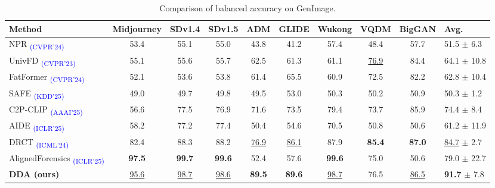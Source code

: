 \documentclass{article}
\begin{document}
\begin{table}[tb!]
  \centering
\caption{Comparison of balanced accuracy on GenImage.}
\label{tab:compare-genimage}
 \begin{adjustbox}{width=\linewidth}
      \begin{tabular}{lccccccccl}
      \toprule
      Method & Midjourney & SDv1.4 & SDv1.5 & ADM & GLIDE & Wukong & VQDM & BigGAN & Avg. \\
      \midrule
NPR \textsubscript{\textcolor{blue}{(CVPR'24)}} \cite{cozzolino2024zero} & 53.4 & 55.1 & 55.0 & 43.8 & 41.2 & 57.4 & 48.4 & 57.7 & 51.5 $\pm$ 6.3 \\
UnivFD \textsubscript{\textcolor{blue}{(CVPR'23)}} \cite{ojha2023towards} & 55.1 & 55.6 & 55.7 & 62.5 & 61.3 & 61.1 & \underline{76.9} & 84.4 & 64.1 $\pm$ 10.8 \\  
FatFormer \textsubscript{\textcolor{blue}{(CVPR'24)}} \cite{liu2024forgery} & 52.1 & 53.6 & 53.8 & 61.4 & 65.5 & 60.9 & 72.5 & 82.2 & 62.8 $\pm$ 10.4 \\
SAFE \textsubscript{\textcolor{blue}{(KDD'25)}} \cite{li2024improving} & 49.0 & 49.7 & 49.8 & 49.5 & 53.0 & 50.3 & 50.2 & 50.9 & 50.3 $\pm$ 1.2 \\
C2P-CLIP \textsubscript{\textcolor{blue}{(AAAI'25)}} \cite{tan2024c2p} & 56.6 & 77.5 & 76.9 & 71.6 & 73.5 & 79.4 & 73.7 & 85.9 & 74.4 $\pm$ 8.4 \\
AIDE \textsubscript{\textcolor{blue}{(ICLR'25)}} \cite{yan2024sanity} & 58.2 & 77.2 & 77.4 & 50.4 & 54.6 & 70.5 & 50.8 & 50.6 & 61.2 $\pm$ 11.9 \\
DRCT \textsubscript{\textcolor{blue}{(ICML'24)}} \cite{chen2024drct} & 82.4 & 88.3 & 88.2 & \underline{76.9} & \underline{86.1} & 87.9 & \textbf{85.4} & \textbf{87.0} & \underline{84.7} $\pm$ 2.7 \\
AlignedForensics \textsubscript{\textcolor{blue}{(ICLR'25)}} \cite{rajan2025aligned} & \textbf{97.5} & \textbf{99.7} & \textbf{99.6} & 52.4 & 57.6 & \textbf{99.6} & 75.0 & 50.6 & 79.0 $\pm$ 22.7 \\
\midrule
\rowcolor{myblue}
\textbf{DDA (ours)} & \underline{95.6} & \underline{98.7} & \underline{98.6} & \textbf{89.5} & \textbf{89.6} & \underline{98.7} & 76.5 & \underline{86.5} & \textbf{91.7} $\pm$ 7.8 \\
\bottomrule
      \end{tabular}
      \end{adjustbox}
      \vspace{0pt}
\end{table}
\end{document}
